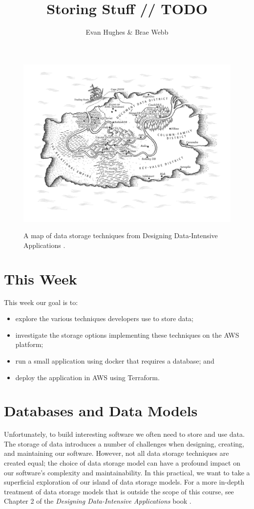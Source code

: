\documentclass{csse4400}
\title{Storing Stuff // TODO}
\author{Evan Hughes \& Brae Webb}
\date{\week{4}}
\begin{document}
\maketitle

\begin{figure}[h]
  \href{https://www.oreilly.com/library/view/designing-data-intensive-applications/9781491903063/ch02.html}{
    \includegraphics[width=\textwidth]{images/databases}
  }
\caption{A map of data storage techniques from Designing Data-Intensive Applications \cite{data-intensive}.}
\end{figure}

\section{This Week}
This week our goal is to:
\begin{itemize}
  \item explore the various techniques developers use to store data;
  \item investigate the storage options implementing these techniques on the AWS platform;
  \item run a small application using docker that requires a database; and
  \item deploy the application in AWS using Terraform.
\end{itemize}

\section{Databases and Data Models}
Unfortunately, to build interesting software we often need to store and use data.
The storage of data introduces a number of challenges when designing, creating, and maintaining our software.
However, not all data storage techniques are created equal;
the choice of data storage model can have a profound impact on our software's complexity and maintainability.
In this practical, we want to take a superficial exploration of our island of data storage models.
For a more in-depth treatment of data storage models that is outside the scope of this course,
see Chapter 2 of the \textit{Designing Data-Intensive Applications} book \cite{data-intensive}.
\end{document}

